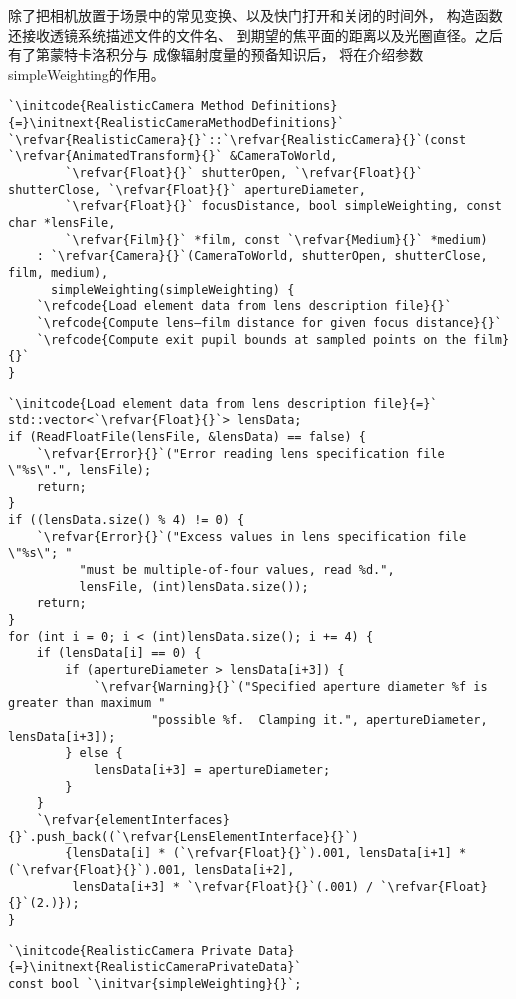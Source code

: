 除了把相机放置于场景中的常见变换、以及快门打开和关闭的时间外，
构造函数还接收透镜系统描述文件的文件名、
到期望的焦平面的距离以及光圈直径。之后有了第蒙特卡洛积分与
成像辐射度量的预备知识后，
将在介绍参数{\ttfamily simpleWeighting}的作用。
\begin{lstlisting}
`\initcode{RealisticCamera Method Definitions}{=}\initnext{RealisticCameraMethodDefinitions}`
`\refvar{RealisticCamera}{}`::`\refvar{RealisticCamera}{}`(const `\refvar{AnimatedTransform}{}` &CameraToWorld,
        `\refvar{Float}{}` shutterOpen, `\refvar{Float}{}` shutterClose, `\refvar{Float}{}` apertureDiameter,
        `\refvar{Float}{}` focusDistance, bool simpleWeighting, const char *lensFile,
        `\refvar{Film}{}` *film, const `\refvar{Medium}{}` *medium)
    : `\refvar{Camera}{}`(CameraToWorld, shutterOpen, shutterClose, film, medium),
      simpleWeighting(simpleWeighting) {
    `\refcode{Load element data from lens description file}{}`
    `\refcode{Compute lens–film distance for given focus distance}{}`
    `\refcode{Compute exit pupil bounds at sampled points on the film}{}`
}
\end{lstlisting}
\begin{lstlisting}
`\initcode{Load element data from lens description file}{=}`
std::vector<`\refvar{Float}{}`> lensData;
if (ReadFloatFile(lensFile, &lensData) == false) {
    `\refvar{Error}{}`("Error reading lens specification file \"%s\".", lensFile);
    return;
}
if ((lensData.size() % 4) != 0) {
    `\refvar{Error}{}`("Excess values in lens specification file \"%s\"; "
          "must be multiple-of-four values, read %d.",
          lensFile, (int)lensData.size());
    return;
}
for (int i = 0; i < (int)lensData.size(); i += 4) {
    if (lensData[i] == 0) {
        if (apertureDiameter > lensData[i+3]) {
            `\refvar{Warning}{}`("Specified aperture diameter %f is greater than maximum "
                    "possible %f.  Clamping it.", apertureDiameter, lensData[i+3]);
        } else {
            lensData[i+3] = apertureDiameter;
        }
    }
    `\refvar{elementInterfaces}{}`.push_back((`\refvar{LensElementInterface}{}`)
        {lensData[i] * (`\refvar{Float}{}`).001, lensData[i+1] * (`\refvar{Float}{}`).001, lensData[i+2],
         lensData[i+3] * `\refvar{Float}{}`(.001) / `\refvar{Float}{}`(2.)});
}
\end{lstlisting}
\begin{lstlisting}
`\initcode{RealisticCamera Private Data}{=}\initnext{RealisticCameraPrivateData}`
const bool `\initvar{simpleWeighting}{}`;
\end{lstlisting}

